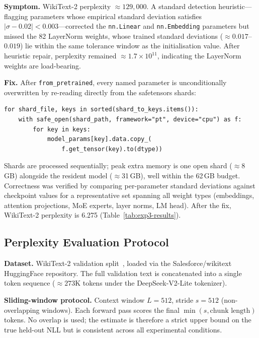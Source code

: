 \medskip\noindent
\textbf{Symptom.}
WikiText-2 perplexity $\approx 129{,}000$.
A standard detection heuristic---flagging parameters whose empirical standard
deviation satisfies $|\sigma - 0.02| < 0.003$---corrected the
\texttt{nn.Linear} and \texttt{nn.Embedding} parameters but missed the 82
LayerNorm weights, whose trained standard deviations ($\approx 0.017$--$0.019$)
lie within the same tolerance window as the initialisation value.
After heuristic repair, perplexity remained $\approx 1.7 \times 10^{11}$,
indicating the LayerNorm weights are load-bearing.

\medskip\noindent
\textbf{Fix.}
After \texttt{from\_pretrained}, every named parameter is unconditionally
overwritten by re-reading directly from the safetensors shards:

\begin{verbatim}
for shard_file, keys in sorted(shard_to_keys.items()):
    with safe_open(shard_path, framework="pt", device="cpu") as f:
        for key in keys:
            model_params[key].data.copy_(
                f.get_tensor(key).to(dtype))
\end{verbatim}

\noindent
Shards are processed sequentially; peak extra memory is one open shard
($\approx$8\,GB) alongside the resident model ($\approx$31\,GB), well within
the 62\,GB budget.
Correctness was verified by comparing per-parameter standard deviations
against checkpoint values for a representative set spanning all weight types
(embeddings, attention projections, MoE experts, layer norms, LM head).
After the fix, WikiText-2 perplexity is 6.275 (Table~\ref{tab:exp3-results}).

\subsection{Perplexity Evaluation Protocol}
\label{app:ppl}

\textbf{Dataset.}
WikiText-2 validation split~\citep{merity2017pointer}, loaded via the
Salesforce/wikitext HuggingFace repository.
The full validation text is concatenated into a single token sequence
(${\approx}273$K tokens under the DeepSeek-V2-Lite tokenizer).

\medskip\noindent
\textbf{Sliding-window protocol.}
Context window $L = 512$, stride $s = 512$ (non-overlapping windows).
Each forward pass scores the final $\min(s, \text{chunk length})$ tokens.
No overlap is used; the estimate is therefore a strict upper bound on the
true held-out NLL but is consistent across all experimental conditions.

